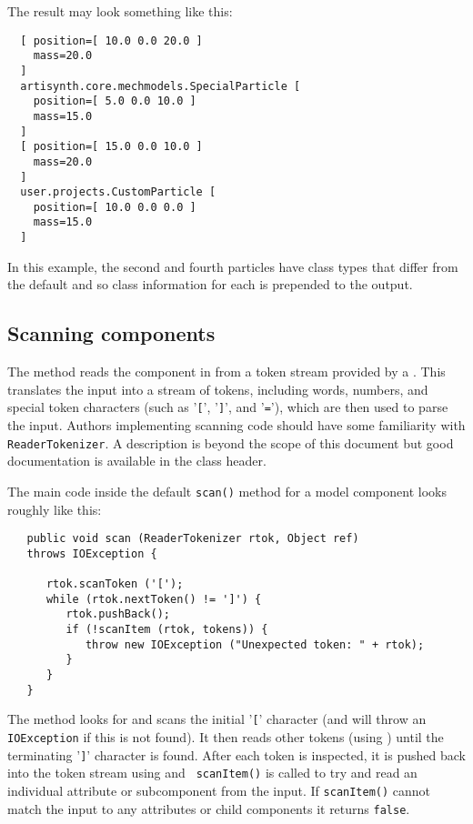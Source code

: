 \documentclass{article}
\begin{document}
The result may look something like this:
\begin{lstlisting}
  [ position=[ 10.0 0.0 20.0 ]
    mass=20.0
  ]
  artisynth.core.mechmodels.SpecialParticle [
    position=[ 5.0 0.0 10.0 ]
    mass=15.0
  ]
  [ position=[ 15.0 0.0 10.0 ]
    mass=20.0
  ]
  user.projects.CustomParticle [ 
    position=[ 10.0 0.0 0.0 ]
    mass=15.0
  ]
\end{lstlisting}
In this example, the second and fourth particles have class types that differ
from the default and so class information for each is prepended
to the output.

\subsection{Scanning components}
\label{scanningComponentsSec}

The  method reads the
component in from a token stream provided by a
. This translates the input
into a stream of tokens, including words, numbers, and special token
characters (such as '{\tt [}', '{\tt ]}', and '{\tt =}'), which are
then used to parse the input. Authors implementing 
scanning code should have some familiarity with {\tt ReaderTokenizer}.
A description is beyond the scope of this document but good
documentation is available in the  
class header.

The main code inside the default {\tt scan()} method for a model
component looks roughly like this:
\begin{lstlisting}
   public void scan (ReaderTokenizer rtok, Object ref) 
   throws IOException {

      rtok.scanToken ('[');
      while (rtok.nextToken() != ']') {
         rtok.pushBack();
         if (!scanItem (rtok, tokens)) {
            throw new IOException ("Unexpected token: " + rtok);
         }
      }
   }
\end{lstlisting}
The method looks for and scans the initial '{\tt [}' character (and
will throw an {\tt IOException} if this is not found). It then reads
other tokens (using
) until the
terminating '{\tt ]}' character is found. After each token is
inspected, it is pushed back into the token stream using
 and {\tt
scanItem()} is called to try and read an individual attribute or
subcomponent from the input. If {\tt scanItem()} cannot match the
input to any attributes or child components it returns {\tt false}.
\end{document}
